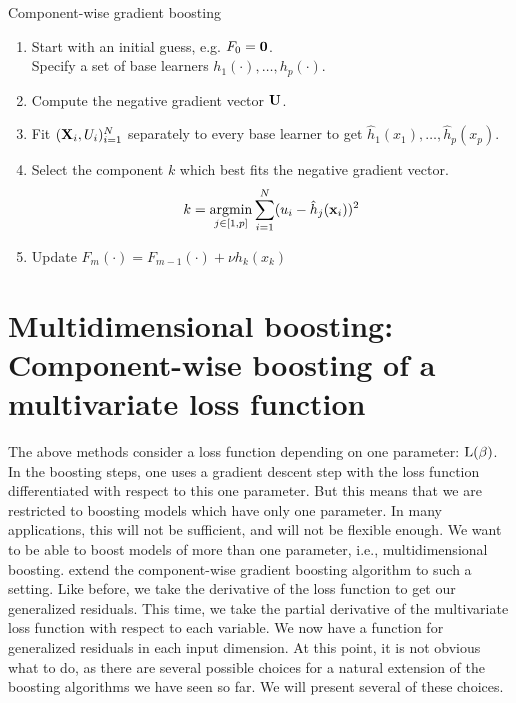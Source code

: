 \begin{algorithm}
\caption{Component-wise gradient boosting}
\label{algo:component-gradboost}
\begin{enumerate}
    \item Start with an initial guess, e.g. $F_0=\mathbf{0}$.\\
    Specify a set of base learners $h_1(\cdot),\dotsc,h_p(\cdot)$.
    \item Compute the negative gradient vector $\mathbf{U}$.
    \item Fit $(\mathbf{X}_i,U_i)_{i=1}^N$ separately to every base learner to get $\hat{h}_1(x_1),\dotsc,\hat{h}_p(x_p)$.
    \item Select the component $k$ which best fits the negative gradient vector.
        \begin{equation*}
            k=\operatorname*{argmin}_{j\in[1,p]}\sum_{i=1}^N(u_i-\hat{h}_j(\mathbf{x}_i))^2
        \end{equation*}
    \item Update $F_m(\cdot)=F_{m-1}(\cdot)+\nu h_k(x_k)$
\end{enumerate}
\end{algorithm}

\section{Multidimensional boosting: Component-wise boosting of a multivariate loss function}
The above methods consider a loss function depending on one parameter: $\operatorname{L}(\beta)$. In the boosting steps, one uses a gradient descent step with the loss function differentiated with respect to this one parameter. But this means that we are restricted to boosting models which have only one parameter. In many applications, this will not be sufficient, and will not be flexible enough. We want to be able to boost models of more than one parameter, i.e., multidimensional boosting.
\citet{schmid} extend the component-wise gradient boosting algorithm \citep{friedman2001} to such a setting. Like before, we take the derivative of the loss function to get our generalized residuals. This time, we take the partial derivative of the multivariate loss function with respect to each variable. We now have a function for generalized residuals in each input dimension. At this point, it is not obvious what to do, as there are several possible choices for a natural extension of the boosting algorithms we have seen so far. We will present several of these choices.


